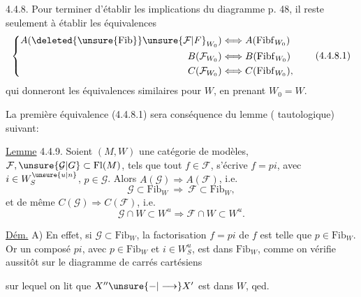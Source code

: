 
4.4.8. Pour terminer d'établir les implications du diagramme p. 48, il reste seulement à établir les équivalences
\[
 \left\{\begin{aligned}
 A(\deleted{\unsure{\mathrm{Fib}}}\unsure{\mathcal{F}|F}_{W_0})&\Longleftrightarrow A(\mathrm{Fibf}_{W_0})\\
 B(\mathcal{F}_{W_0})&\Longleftrightarrow B(\mathrm{Fibf}_{W_0})\\
 C(\mathcal{F}_{W_0})&\Longleftrightarrow C(\mathrm{Fibf}_{W_0}),
 \end{aligned}\right. \tag*{(4.4.8.1)}
\]
qui donneront les équivalences similaires pour $W$, en prenant $W_0=W$.

\unsure{--} La première équivalence (4.4.8.1) sera conséquence du lemme (\inserted{$\pm$} tautologique) suivant:

\uline{Lemme} 4.4.9. Soient $(M,W)$ une catégorie de modèles, $\mathcal{F},\unsure{\mathcal{G}|G}\subset\mathrm{Fl}(M)$, tels que tout $f\in\mathcal{F}$,  s'écrive $f=pi$, avec $i\in W^{\unsure{u|n}}_S$, $p\in\mathcal{G}$. Alors $A(\mathcal{G})\Longrightarrow A(\mathcal{F})$, i.e.
\[
 \mathcal{G}\subset\mathrm{Fib}_{W}\ \Longrightarrow\ \mathcal{F}\subset\mathrm{Fib}_{W}, \tag*{(4.4.9.1)}
\]
et de même  $C(\mathcal{G})\Longrightarrow C(\mathcal{F})$, i.e.
\[
 \mathcal{G}\cap W\subset W^u\Longrightarrow\mathcal{F}\cap W\subset W^u. \tag*{(4.4.9.2)}
\]

\uline{Dém.} A) En effet, si  $\mathcal{G}\subset\mathrm{Fib}_{W}$, la factorisation $f=pi$ de $f$ est telle que $p\in\mathrm{Fib}_{W}$. Or un composé $pi$, avec $p\in\mathrm{Fib}_{W}$ et $i\in W_S^u$, est dans $\mathrm{Fib}_{W}$, comme on vérifie aussitôt sur le diagramme de carrés cartésiens


sur lequel on lit que $X''\unsure{\mathbin{-}|\longrightarrow}X'$ est dans $W$, qed.
